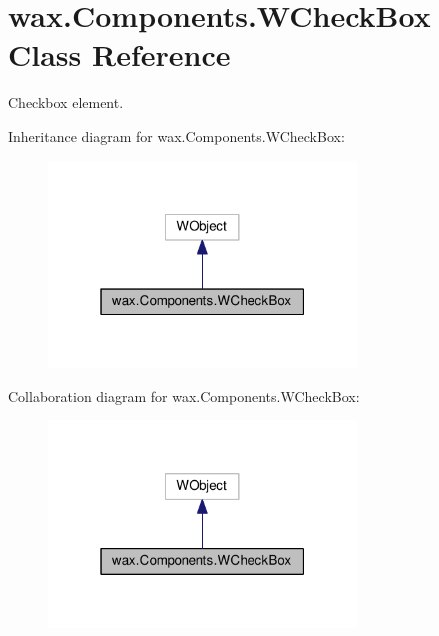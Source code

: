 \hypertarget{classwax_1_1Components_1_1WCheckBox}{}\section{wax.\+Components.\+W\+Check\+Box Class Reference}
\label{classwax_1_1Components_1_1WCheckBox}


Checkbox element.  




Inheritance diagram for wax.\+Components.\+W\+Check\+Box\+:\nopagebreak
\begin{figure}[H]
\begin{center}
\leavevmode
\includegraphics[width=232pt]{classwax_1_1Components_1_1WCheckBox__inherit__graph}
\end{center}
\end{figure}


Collaboration diagram for wax.\+Components.\+W\+Check\+Box\+:\nopagebreak
\begin{figure}[H]
\begin{center}
\leavevmode
\includegraphics[width=232pt]{classwax_1_1Components_1_1WCheckBox__coll__graph}
\end{center}
\end{figure}
